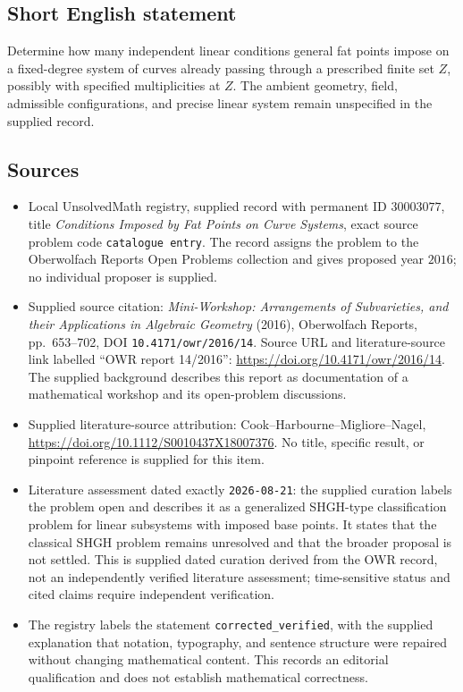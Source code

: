 \documentclass[11pt]{article}
\begin{document}
\subsection{Short English statement}
Determine how many independent linear conditions general fat points impose on a fixed-degree system of curves already passing through a prescribed finite set \(Z\), possibly with specified multiplicities at \(Z\). The ambient geometry, field, admissible configurations, and precise linear system remain unspecified in the supplied record.
\subsection{Sources}
\begin{itemize}
\item Local UnsolvedMath registry, supplied record with permanent ID \(30003077\), title \emph{Conditions Imposed by Fat Points on Curve Systems}, exact source problem code \texttt{catalogue entry}. The record assigns the problem to the Oberwolfach Reports Open Problems collection and gives proposed year \(2016\); no individual proposer is supplied.
\item Supplied source citation: \emph{Mini-Workshop: Arrangements of Subvarieties, and their Applications in Algebraic Geometry} (2016), Oberwolfach Reports, pp.\ 653--702, DOI \texttt{10.4171/owr/2016/14}. Source URL and literature-source link labelled ``OWR report 14/2016'': \url{https://doi.org/10.4171/owr/2016/14}. The supplied background describes this report as documentation of a mathematical workshop and its open-problem discussions.
\item Supplied literature-source attribution: Cook--Harbourne--Migliore--Nagel, \url{https://doi.org/10.1112/S0010437X18007376}. No title, specific result, or pinpoint reference is supplied for this item.
\item Literature assessment dated exactly \texttt{2026-08-21}: the supplied curation labels the problem open and describes it as a generalized SHGH-type classification problem for linear subsystems with imposed base points. It states that the classical SHGH problem remains unresolved and that the broader proposal is not settled. This is supplied dated curation derived from the OWR record, not an independently verified literature assessment; time-sensitive status and cited claims require independent verification.
\item The registry labels the statement \texttt{corrected\_verified}, with the supplied explanation that notation, typography, and sentence structure were repaired without changing mathematical content. This records an editorial qualification and does not establish mathematical correctness.
\end{itemize}
\end{document}
